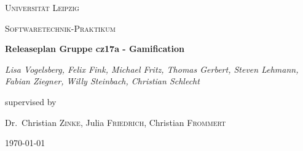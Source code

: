 \documentclass[11pt,a4paper]{scrreprt}
\begin{document}
\begin{titlepage}
	\centering
	{\scshape\LARGE Universität Leipzig \par}
	\vspace{1cm}
	{\scshape\Large Softwaretechnik-Praktikum \par}
	\vspace{2cm}
	{\huge\bfseries Releaseplan Gruppe cz17a - Gamification \par}
	\vspace{2cm}
	{\Large\itshape Lisa Vogelsberg, Felix Fink, Michael Fritz, Thomas Gerbert, Steven Lehmann, Fabian Ziegner, Willy Steinbach, 			Christian Schlecht \par}
	\vfill
	supervised by \par
	Dr.~Christian \textsc{Zinke}, Julia \textsc{Friedrich}, Christian \textsc{Frommert}
	\vfill
	{\large \today \par}
\end{titlepage}
\tableofcontents
\end{document}
